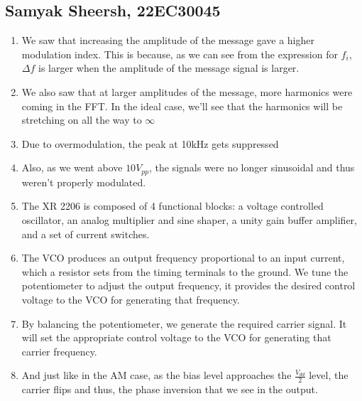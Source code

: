 \documentclass{article}
\begin{document}
\subsection{Samyak Sheersh, 22EC30045}
\begin{enumerate}
  \item We saw that increasing the amplitude of the message gave a higher modulation index. This is because, as we can see from the expression for $f_i$, $\Delta f$ is larger when the amplitude of the message signal is larger. 
  \item We also saw that at larger amplitudes of the message, more harmonics were coming in the FFT. In the ideal case, we'll see that the harmonics will be stretching on all the way to $\infty$
  \item  Due to overmodulation, the peak at 10kHz gets suppressed
  \item Also, as we went above $10 V_{pp}$, the signals were no longer sinusoidal and thus weren't properly modulated.
  \item The XR 2206 is composed of 4 functional blocks: a voltage controlled oscillator, an analog multiplier and sine shaper, a unity gain buffer amplifier, and a set of current switches.
  \item The VCO produces an output frequency proportional to an input current, which a resistor sets from the timing terminals to the ground. We tune the potentiometer to adjust the output frequency, it provides the desired control voltage to the VCO for generating that frequency.
  \item By balancing the potentiometer, we generate the required carrier signal. It will set the appropriate control voltage to the VCO for generating that carrier frequency.
  \item And just like in the AM case, as the bias level approaches the $\frac{V_{dd}}{2}$ level, the carrier flips and thus, the phase inversion that we see in the output.
\end{enumerate}
\end{document}
